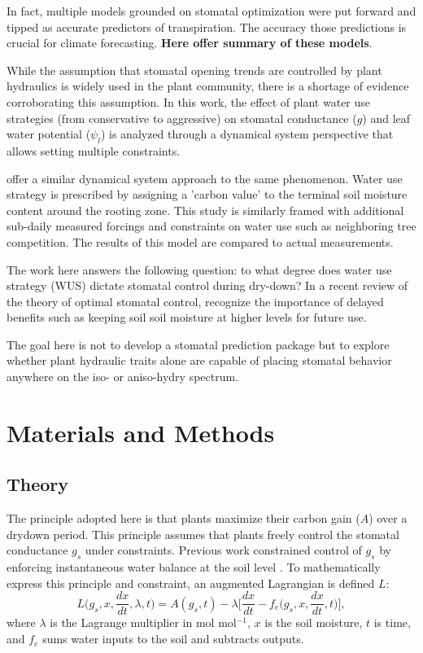 \documentclass[utf8]{frontiersSCNS} %
\begin{document}
In fact, multiple models grounded on stomatal optimization were put forward and tipped as accurate predictors of transpiration. The accuracy those predictions is crucial for climate forecasting. \textbf{Here offer summary of these models}.

While the assumption that stomatal opening trends are controlled by plant hydraulics is widely used in the plant community, there is a shortage of evidence corroborating this assumption. In this work, the effect of plant water use strategies (from conservative to aggressive) on stomatal conductance ($g$) and leaf water potential ($\psi_l$) is analyzed through a dynamical system perspective that allows setting multiple constraints. 

\citet{Manzoni2013} offer a similar dynamical system approach to the same phenomenon. Water use strategy is prescribed by assigning a 'carbon value' to the terminal soil moisture content around the rooting zone. This study is similarly framed with additional sub-daily measured forcings and constraints on water use such as neighboring tree competition. The results of this model are compared to actual measurements.

The work here answers the following question: to what degree does water use strategy (WUS) dictate stomatal control during dry-down? In a recent review of the theory of optimal stomatal control, \citet{Buckley2017} recognize the importance of delayed benefits such as keeping soil soil moisture at higher levels for future use. 

The goal here is not to develop a stomatal prediction package but to explore whether plant hydraulic traits alone are capable of placing stomatal behavior anywhere on the iso- or aniso-hydry spectrum. 

\section{Materials and Methods}

\subsection{Theory}

The principle adopted here is that plants maximize their carbon gain ($A$) over a drydown period. This principle assumes that plants freely control the stomatal conductance $g_s$ under constraints. Previous work constrained control of $g_s$ by enforcing instantaneous water balance at the soil level \citep{Manzoni2013}. To mathematically express this principle and constraint, an augmented Lagrangian is defined $L$:
\begin{equation}
    \label{eqn:Lagrangian}
    L\Big(g_s, x, \frac{dx}{dt}, \lambda, t\Big) = A(g_s, t) - \lambda \Bigg[ \frac{dx}{dt} - f_e\Big(g_s, x, \frac{dx}{dt}, t\Big)\Bigg],
\end{equation}
where $\lambda$ is the Lagrange multiplier in mol mol$^{-1}$, $x$ is the soil moisture, $t$ is time, and $f_e$ sums water inputs to the soil and subtracts outputs.
\end{document}
